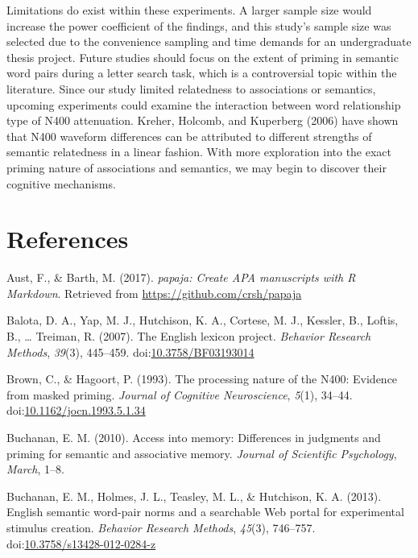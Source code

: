 \documentclass[english,man]{apa6}
\theoremstyle{definition}
\theoremstyle{definition}
\theoremstyle{definition}
\theoremstyle{remark}
\begin{document}
Limitations do exist within these experiments. A larger sample size
would increase the power coefficient of the findings, and this study's
sample size was selected due to the convenience sampling and time
demands for an undergraduate thesis project. Future studies should focus
on the extent of priming in semantic word pairs during a letter search
task, which is a controversial topic within the literature. Since our
study limited relatedness to associations or semantics, upcoming
experiments could examine the interaction between word relationship type
of N400 attenuation. Kreher, Holcomb, and Kuperberg (2006) have shown
that N400 waveform differences can be attributed to different strengths
of semantic relatedness in a linear fashion. With more exploration into
the exact priming nature of associations and semantics, we may begin to
discover their cognitive mechanisms.

\newpage

\section{References}\label{references}

\setlength{\parindent}{-0.5in} \setlength{\leftskip}{0.5in}

\hypertarget{refs}{}
\hypertarget{ref-R-papaja}{}
Aust, F., \& Barth, M. (2017). \emph{papaja: Create APA manuscripts with
R Markdown}. Retrieved from \url{https://github.com/crsh/papaja}

\hypertarget{ref-Balota2007}{}
Balota, D. A., Yap, M. J., Hutchison, K. A., Cortese, M. J., Kessler,
B., Loftis, B., \ldots{} Treiman, R. (2007). The English lexicon
project. \emph{Behavior Research Methods}, \emph{39}(3), 445--459.
doi:\href{https://doi.org/10.3758/BF03193014}{10.3758/BF03193014}

\hypertarget{ref-Brown1993}{}
Brown, C., \& Hagoort, P. (1993). The processing nature of the N400:
Evidence from masked priming. \emph{Journal of Cognitive Neuroscience},
\emph{5}(1), 34--44.
doi:\href{https://doi.org/10.1162/jocn.1993.5.1.34}{10.1162/jocn.1993.5.1.34}

\hypertarget{ref-Buchanan2010}{}
Buchanan, E. M. (2010). Access into memory: Differences in judgments and
priming for semantic and associative memory. \emph{Journal of Scientific
Psychology}, \emph{March}, 1--8.

\hypertarget{ref-Buchanan2013}{}
Buchanan, E. M., Holmes, J. L., Teasley, M. L., \& Hutchison, K. A.
(2013). English semantic word-pair norms and a searchable Web portal for
experimental stimulus creation. \emph{Behavior Research Methods},
\emph{45}(3), 746--757.
doi:\href{https://doi.org/10.3758/s13428-012-0284-z}{10.3758/s13428-012-0284-z}
\end{document}
